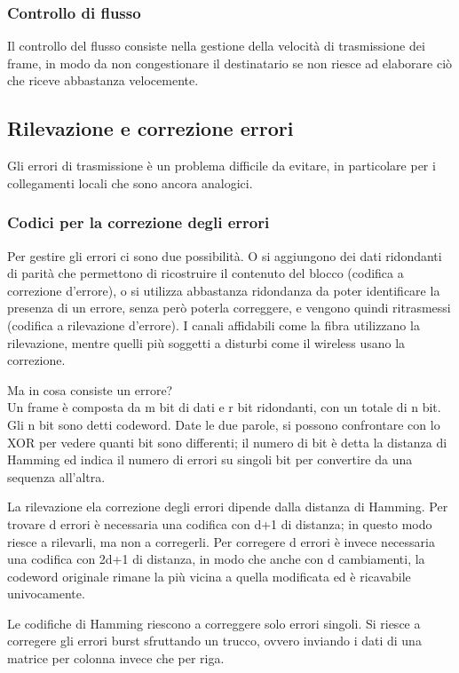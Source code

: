 \subsubsection{Controllo di flusso}
Il controllo del flusso consiste nella gestione della velocità di trasmissione dei frame,
in modo da non congestionare il destinatario se non riesce ad elaborare ciò che riceve abbastanza velocemente.

\subsection{Rilevazione e correzione errori} %
Gli errori di trasmissione è un problema difficile da evitare, in particolare per i collegamenti locali che sono ancora analogici.

\subsubsection{Codici per la correzione degli errori}
Per gestire gli errori ci sono due possibilità. 
O si aggiungono dei dati ridondanti di parità che permettono di ricostruire il contenuto del blocco (codifica a correzione d'errore),
o si utilizza abbastanza ridondanza da poter identificare la presenza di un errore, senza però poterla correggere, e vengono quindi ritrasmessi (codifica a rilevazione d'errore).
I canali affidabili come la fibra utilizzano la rilevazione, mentre quelli più soggetti a disturbi come il wireless usano la correzione.

Ma in cosa consiste un errore? \\
Un frame è composta da m bit di dati e r bit ridondanti, con un totale di n bit.
Gli n bit sono detti codeword. 
Date le due parole, si possono confrontare con lo XOR per vedere quanti bit sono differenti;
il numero di bit è detta la distanza di Hamming ed indica il numero di errori su singoli bit per convertire da una sequenza all'altra.

La rilevazione ela correzione degli errori dipende dalla distanza di Hamming.
Per trovare d errori è necessaria una codifica con d+1 di distanza;
in questo modo riesce a rilevarli, ma non a corregerli.
Per corregere d errori è invece necessaria una codifica con 2d+1 di distanza,
in modo che anche con d cambiamenti, la codeword originale rimane la più vicina a quella modificata ed è ricavabile univocamente.

Le codifiche di Hamming riescono a correggere solo errori singoli.
Si riesce a corregere gli errori burst sfruttando un trucco, ovvero inviando i dati di una matrice per colonna invece che per riga.

